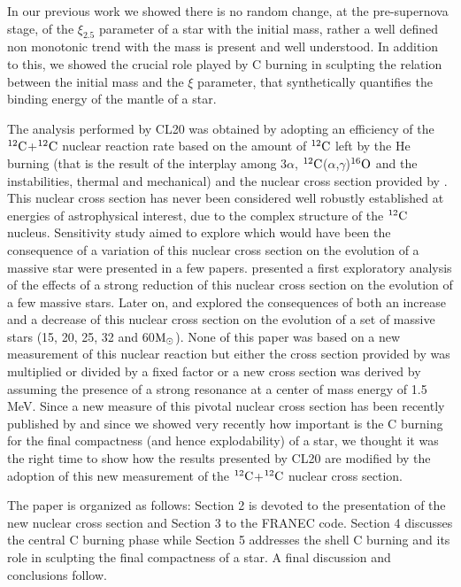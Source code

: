 \documentclass{aastex631}
\newcommand{\msun}{$\rm M_\odot$}
\newcommand\nuk[2]{$\rm ^{\rm #2} #1$}
\begin{document}
In our previous work we showed there is no random change, at the pre-supernova stage, of the $\xi_{2.5}$ parameter of a star with the initial mass, rather a well defined non monotonic trend with the mass is present and well understood. In addition to this, we showed the crucial role played by C burning in sculpting the relation between the initial mass and the $\xi$ parameter, that synthetically quantifies the binding energy of the mantle of a star. 

The analysis performed by CL20 was obtained by adopting an efficiency of the \nuk{C}{12}+\nuk{C}{12} nuclear reaction rate based on the amount of \nuk{C}{12} left by the He burning (that is the result of the interplay among 3$\alpha$, \nuk{C}{12}($\alpha$,$\gamma$)\nuk{O}{16} and the instabilities, thermal and mechanical) and the nuclear cross section provided by \cite{cf88}. This nuclear cross section has never been considered well robustly established at energies of astrophysical interest, due to the complex structure of the \nuk{C}{12} nucleus. Sensitivity study aimed to explore which would have been the consequence of a variation of this nuclear cross section on the evolution of a massive star were presented in a few papers. \cite{ga07} presented a first exploratory analysis of the effects of a strong reduction of this nuclear cross section on the evolution of a few massive stars. Later on, \cite{be12} and \cite{pi13} explored the consequences of both an increase and a decrease of this nuclear cross section on the evolution of a set of massive stars (15, 20, 25, 32 and 60\msun). None of this paper was based on a new measurement of this nuclear reaction but either the cross section provided by \cite{cf88} was multiplied or divided by a fixed factor or a new cross section was derived by assuming the presence of a strong resonance at a center of mass energy of 1.5 MeV. Since a new measure of this pivotal nuclear cross section has been recently published by \cite{thm18} and since we showed very recently how important is the C burning for the final compactness (and hence explodability) of a star, we thought it was the right time to show how the results presented by CL20 are modified by the adoption of this new measurement of the \nuk{C}{12}+\nuk{C}{12} nuclear cross section.

The paper is organized as follows: Section 2 is devoted to the presentation of the new nuclear cross section and Section 3 to the FRANEC code. Section 4 discusses the central C burning phase while Section 5 addresses the shell C burning and its role in sculpting the final compactness of a star. A final discussion and conclusions follow.
\end{document}
